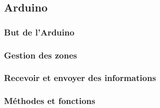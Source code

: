 \subsection{Arduino}
\subsubsection{But de l'Arduino}
\subsubsection{Gestion des zones}
\subsubsection{Recevoir et envoyer des informations}
\subsubsection{Méthodes et fonctions}
